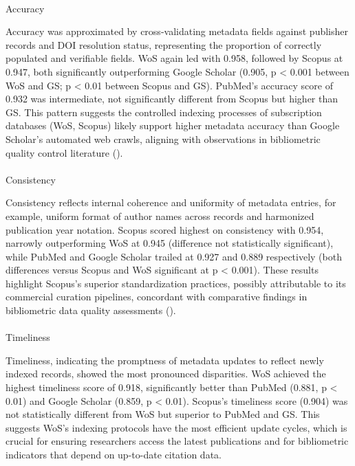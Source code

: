 \documentclass[
  12pt,
]{article}
\makeatletter
\let\oldparagraph\paragraph
\renewcommand{\paragraph}{
    \@ifstar
      \xxxParagraphStar
      \xxxParagraphNoStar
  }
\newcommand{\xxxParagraphStar}[1]{\oldparagraph*{#1}\mbox{}}
\newcommand{\xxxParagraphNoStar}[1]{\oldparagraph{#1}\mbox{}}
\makeatother
\begin{document}
\paragraph{Accuracy}\label{accuracy-1}

Accuracy was approximated by cross-validating metadata fields against
publisher records and DOI resolution status, representing the proportion
of correctly populated and verifiable fields. WoS again led with 0.958,
followed by Scopus at 0.947, both significantly outperforming Google
Scholar (0.905, p \textless{} 0.001 between WoS and GS; p \textless{}
0.01 between Scopus and GS). PubMed's accuracy score of 0.932 was
intermediate, not significantly different from Scopus but higher than
GS. This pattern suggests the controlled indexing processes of
subscription databases (WoS, Scopus) likely support higher metadata
accuracy than Google Scholar's automated web crawls, aligning with
observations in bibliometric quality control literature
().

\paragraph{Consistency}\label{consistency-1}

Consistency reflects internal coherence and uniformity of metadata
entries, for example, uniform format of author names across records and
harmonized publication year notation. Scopus scored highest on
consistency with 0.954, narrowly outperforming WoS at 0.945 (difference
not statistically significant), while PubMed and Google Scholar trailed
at 0.927 and 0.889 respectively (both differences versus Scopus and WoS
significant at p \textless{} 0.001). These results highlight Scopus's
superior standardization practices, possibly attributable to its
commercial curation pipelines, concordant with comparative findings in
bibliometric data quality assessments ().

\paragraph{Timeliness}\label{timeliness-1}

Timeliness, indicating the promptness of metadata updates to reflect
newly indexed records, showed the most pronounced disparities. WoS
achieved the highest timeliness score of 0.918, significantly better
than PubMed (0.881, p \textless{} 0.01) and Google Scholar (0.859, p
\textless{} 0.01). Scopus's timeliness score (0.904) was not
statistically different from WoS but superior to PubMed and GS. This
suggests WoS's indexing protocols have the most efficient update cycles,
which is crucial for ensuring researchers access the latest publications
and for bibliometric indicators that depend on up-to-date citation data.
\end{document}
